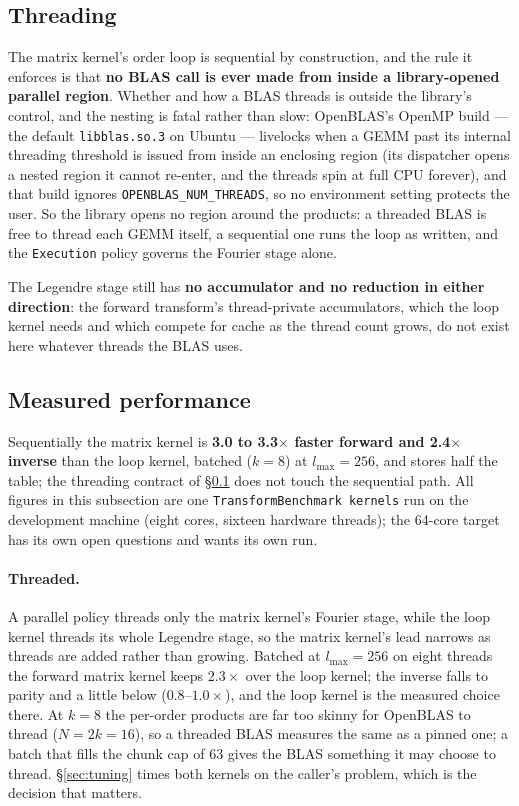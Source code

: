\documentclass[11pt,a4paper]{article}
\newcommand{\code}[1]{\texttt{#1}}
\begin{document}
\subsection{Threading}
\label{sec:gemmthreads}

The matrix kernel's order loop is sequential by construction, and the rule
it enforces is that \textbf{no BLAS call is ever made from inside a
library-opened parallel region}.  Whether and how a BLAS threads is
outside the library's control, and the nesting is fatal rather than slow:
OpenBLAS's OpenMP build --- the default \code{libblas.so.3} on Ubuntu ---
livelocks when a GEMM past its internal threading threshold is issued from
inside an enclosing region (its dispatcher opens a nested region it cannot
re-enter, and the threads spin at full CPU forever), and that build
ignores \code{OPENBLAS\_NUM\_THREADS}, so no environment setting protects
the user.  So the library opens no region around the products: a threaded
BLAS is free to thread each GEMM itself, a sequential one runs the loop as
written, and the \code{Execution} policy governs the Fourier stage alone.

The Legendre stage still has \textbf{no accumulator and no reduction in
either direction}: the forward transform's thread-private accumulators,
which the loop kernel needs and which compete for cache as the thread
count grows, do not exist here whatever threads the BLAS uses.

\subsection{Measured performance}
\label{sec:gemmdone}

Sequentially the matrix kernel is \textbf{3.0 to 3.3$\times$ faster
forward and 2.4$\times$ inverse} than the loop kernel, batched ($k=8$) at
$l_{\max}=256$, and stores half the table; the threading contract of
\S\ref{sec:gemmthreads} does not touch the sequential path.  All figures
in this subsection are one \code{TransformBenchmark kernels} run on the
development machine (eight cores, sixteen hardware threads); the 64-core
target has its own open questions and wants its own run.

\paragraph{Threaded.}  A parallel policy threads only the matrix kernel's
Fourier stage, while the loop kernel threads its whole Legendre stage, so
the matrix kernel's lead narrows as threads are added rather than
growing.  Batched at $l_{\max}=256$ on eight threads the forward matrix
kernel keeps $2.3\times$ over the loop kernel; the inverse falls to
parity and a little below ($0.8$--$1.0\times$), and the loop kernel is
the measured choice there.  At $k=8$ the per-order products are far too
skinny for OpenBLAS to thread ($N = 2k = 16$), so a threaded BLAS
measures the same as a pinned one; a batch that fills the chunk cap of 63
gives the BLAS something it may choose to thread.  \S\ref{sec:tuning}
times both kernels on the caller's problem, which is the decision that
matters.
\end{document}

